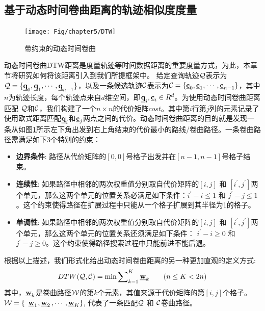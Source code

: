 \subsection{基于动态时间卷曲距离的轨迹相似度度量}\label{sec-c5-DTW}
\begin{figure}[t]
	\centering
	\texttt{[image: Fig/chapter5/DTW]}
	\caption{带约束的动态时间卷曲}
	\label{fig:DTW}
\end{figure}
动态时间卷曲DTW距离是度量轨迹等时间数据距离的重要度量方式\cite{XXD}，为此，本章节将研究如何将该距离引入到我们所提框架中。
给定查询轨迹$\cal Q$表示为${\cal Q}=\{\emph{{\textbf{q}}}_{0}, \emph{{\textbf{q}}}_{1}, \cdots, \emph{{\textbf{q}}}_{n-1}\}$，以及一条候选轨迹$\cal C$表示为${\cal C}=\{\emph{{\textbf{c}}}_{0}, \emph{{\textbf{c}}}_{1}, \cdots, \emph{{\textbf{c}}}_{n-1}\}$，其中$n$为轨迹长度，每个轨迹点来自$d$维空间，即$\emph{{\textbf{q}}}_{i},\emph{{\textbf{c}}}_{i} \in R^{d}$。为使用动态时间卷曲距离匹配 $\cal Q$和$\cal C$，我们构建了一个$n\times n$的代价矩阵$cost$。其中第$i$行第$j$列的元素记录了使用欧式距离匹配$\emph{{\textbf{q}}}_{i}$和$\emph{{\textbf{c}}}_{j}$两点之间的代价。动态时间卷曲距离的目的就是发现一条从如图\ref{fig:DTW}所示左下角出发到右上角结束的代价最小的路线/卷曲路径。一条卷曲路径需满足如下3个特别的约束：
\begin{itemize}
	\item \textbf{边界条件}: 路径从代价矩阵的$[0,0]$号格子出发并在$[n-1,n-1]$号格子结束。
	
	\item \textbf{连续性}: 如果路径中相邻的两次权重值分别取自代价矩阵的$[i,j]$ 和 $[i^{'},j^{'}]$两个单元，那么这两个单元的位置关系必满足如下条件：$i^{'}-i\le 1$ 和 $j^{'} - j \le 1$。这个约束使得路径在扩展过程中只能从一个格子扩展到其半径为1的格子。
	\item \textbf{单调性}: 如果路径中相邻的两次权重值分别取自代价矩阵的$[i,j]$ 和 $[i^{'},j^{'}]$两个单元，那么这两个单元的位置关系还须满足如下条件： $i^{'}-i\ge 0$ 和 $j^{'} - j \ge 0$。这个约束使得路径搜索过程中只能前进不能后退。
\end{itemize}
根据以上描述，我们形式化给出动态时间卷曲距离的另一种更加直观的定义方式:
\begin{eqnarray}\label{eq:dtwDef}
DTW({\cal Q}, {\cal C})= \min{\sum\nolimits_{k=1}^{K}\emph{{\textbf{w}}}_{k}} \qquad {(n\le K < 2n)}
\end{eqnarray}
其中，$\emph{{\textbf{w}}}_{k}$是卷曲路径$\cal W$的第$k$个元素，其值来源于代价矩阵的第$[i,j]$个格子。
$\cal{W}=\{$ $\emph{{\textbf{w}}}_{1}$$,\emph{{\textbf{w}}}_{2}$$,\cdots,\emph{{\textbf{w}}}_{K}\}$, 代表了一条匹配$\cal{Q}$ 和 $\cal{C}$卷曲路径。

